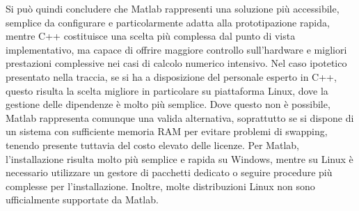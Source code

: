 Si può quindi concludere che Matlab rappresenti una soluzione più accessibile,
semplice da configurare e particolarmente adatta alla prototipazione rapida,
mentre C++ costituisce una scelta più complessa dal punto di vista implementativo,
ma capace di offrire maggiore controllo sull'hardware
e migliori prestazioni complessive nei casi di calcolo numerico intensivo.
Nel caso ipotetico presentato nella traccia, se si ha a disposizione del personale esperto in C++,
questo risulta la scelta migliore in particolare su piattaforma Linux,
dove la gestione delle dipendenze è molto più semplice.
Dove questo non è possibile, Matlab rappresenta comunque una valida alternativa,
soprattutto se si dispone di un sistema con sufficiente memoria RAM per evitare problemi di swapping,
tenendo presente tuttavia del costo elevato delle licenze.
Per Matlab, l'installazione risulta molto più semplice e rapida su Windows,
mentre su Linux è necessario utilizzare un gestore di pacchetti dedicato o seguire procedure più complesse per l'installazione.
Inoltre, molte distribuzioni Linux non sono ufficialmente supportate da Matlab.
